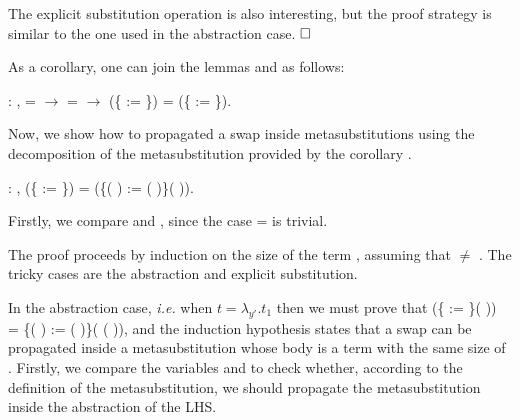 \begin{coqdoccode}
\end{coqdoccode}
The explicit substitution operation is also interesting, but the proof strategy is similar to the one used in the abstraction case. $\hfill\Box$
\begin{coqdoccode}
\coqdocemptyline
\end{coqdoccode}
As a corollary, one can join the lemmas  and  as follows:
\begin{coqdoccode}
\coqdocemptyline
\coqdocnoindent
{} : \coqdockw{\ensuremath{\forall}}     ,  =  \ensuremath{\rightarrow}  =  \ensuremath{\rightarrow} (\{ := \}) = (\{ := \}).\coqdoceol
\coqdocemptyline
\end{coqdoccode}
Now, we show how to propagated a swap inside metasubstitutions using the decomposition of the metasubstitution provided by the corollary .\newline 
\begin{coqdoccode}
\coqdocemptyline
\coqdocnoindent
{} : \coqdockw{\ensuremath{\forall}}     ,    (\{ := \}) = (\{(   ) := (   )\}(   )).\coqdoceol
\end{coqdoccode}
 Firstly, we compare  and , since the case  =  is trivial.
\begin{coqdoccode}
\end{coqdoccode}
The proof proceeds by induction on the size of the term , assuming that  \ensuremath{\not=} . The tricky cases are the abstraction and explicit substitution. 
\begin{coqdoccode}
\end{coqdoccode}
In the abstraction case, {\it i.e.} when $t = \lambda_{y'}.t_1$ then we must prove that    (\{ := \}(  )) = \{(   ) := (   )\}(   (  )), and the induction hypothesis states that a swap can be propagated inside a metasubstitution whose body is a term with the same size of . Firstly, we compare the variables  and  to check whether, according to the definition of the metasubstitution, we should propagate the metasubstitution inside the abstraction of the LHS. 

